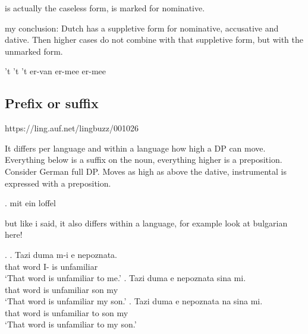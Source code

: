 \documentclass[12pt]{article}
\begin{document}
 is actually the caseless form,  is marked for nominative.


my conclusion: Dutch has a suppletive form for nominative, accusative and dative. Then higher cases do not combine with that suppletive form, but with the unmarked form.

't
't
't
er-van
er-mee
er-mee








\subsection{Prefix or suffix}

https://ling.auf.net/lingbuzz/001026

It differs per language and within a language how high a DP can move. Everything below is a suffix on the noun, everything higher is a preposition. Consider German full DP. Moves as high as above the dative, instrumental is expressed with a preposition.

\ex. mit ein loffel

but like i said, it also differs within a language, for example look at bulgarian here!

\ex.
\ag. Tazi duma m-i e nepoznata.\\
that word I- is unfamiliar\\
`That word is unfamiliar to me.'
\bg. Tazi duma e nepoznata sina mi.\\
that word is unfamiliar son my\\
`That word is unfamiliar my son.'
\bg. Tazi duma e nepoznata na sina mi.\\
that word is unfamiliar to son my\\
`That word is unfamiliar to my son.'







%
%
%
%
%
%
\end{document}
